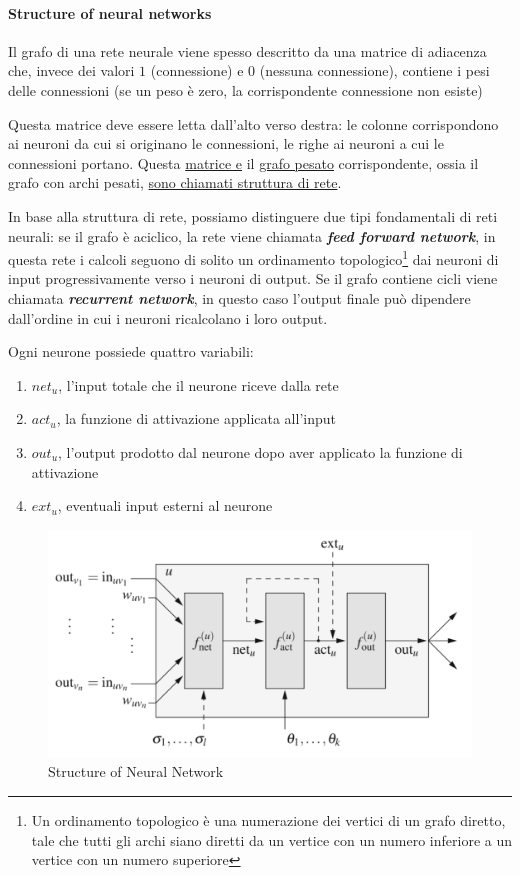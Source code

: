 \paragraph{Structure of neural networks}
Il grafo di una rete neurale viene spesso descritto da una matrice di adiacenza che, invece dei valori $1$ (connessione) e $0$ (nessuna connessione), contiene i pesi delle connessioni (se un peso è zero, la corrispondente connessione non esiste)

Questa matrice deve essere letta dall'alto verso destra: le colonne corrispondono ai neuroni da cui si originano le connessioni, le righe ai neuroni a cui le connessioni portano. Questa \uline{matrice e} il \uline{grafo pesato} corrispondente, ossia il grafo con archi pesati, \uline{sono chiamati struttura di rete}.

In base alla struttura di rete, possiamo distinguere due tipi fondamentali di reti neurali: se il grafo è aciclico, la rete viene chiamata \textit{\textbf{feed forward network}}, in questa rete i calcoli seguono di solito un ordinamento topologico\footnote{Un ordinamento topologico è una numerazione dei vertici di un grafo diretto, tale che tutti gli archi siano diretti da un vertice con un numero inferiore a un vertice con un numero superiore} dai neuroni di input progressivamente verso i neuroni di output. Se il grafo contiene cicli viene chiamata \textit{\textbf{recurrent network}}, in questo caso l'output finale può dipendere dall'ordine in cui i neuroni ricalcolano i loro output.

Ogni neurone possiede quattro variabili: 
\begin{enumerate}
    \item $net_u$, l'input totale che il neurone riceve dalla rete
    \item $act_u$, la funzione di attivazione applicata all'input
    \item $out_u$, l'output prodotto dal neurone dopo aver applicato la funzione di attivazione
    \item $ext_u$, eventuali input esterni al neurone
\end{enumerate}

\begin{figure}[h]
    \centering
    \includegraphics[scale=0.5]{images/structure_of_nn.png}
    \caption{Structure of Neural Network}
\end{figure}

